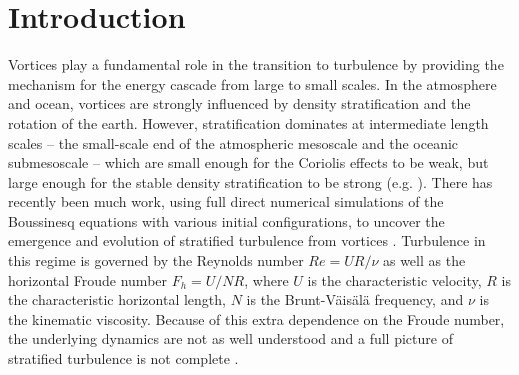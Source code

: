 \chapter{Introduction}



Vortices play a fundamental role in the transition to turbulence by providing the mechanism for the energy cascade from large to small scales. In the atmosphere and ocean, vortices are strongly influenced by density stratification and the rotation of the earth. However, stratification dominates at intermediate length scales -- the small-scale end of the atmospheric mesoscale and the oceanic submesoscale --  which are small enough for the Coriolis effects to be weak, but large enough for the stable density stratification to be strong (e.g. \cite{riley2003,waitebartello2004,rileylindborg2013}).  There has recently been much work, using full direct numerical simulations of the Boussinesq equations with various initial configurations, to uncover the emergence and evolution of stratified turbulence from vortices \cite{waitesmol2008,delonclebc2008,augierbillant2011,augier2012}. Turbulence in this regime is governed by the Reynolds number $Re=UR/\nu$ as well as the horizontal Froude number $F_{h}=U/NR$, where $U$ is the characteristic velocity, $R$ is the characteristic horizontal length, $N$ is the Brunt-V\"{a}is\"{a}l\"{a} frequency, and $\nu$ is the kinematic viscosity. Because of this extra dependence on the Froude number, the underlying dynamics are not as well understood and a full picture of stratified turbulence is not complete \cite{rileylelong2000,riley2003,waitebartello2004,lindborg2006,rileylindborg2013}.  

